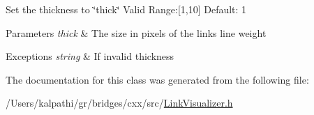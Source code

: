 Set the thickness to \char`\"{}thick\char`\"{} Valid Range\+:\mbox{[}1,10\mbox{]} Default\+: 1


\begin{DoxyParams}{Parameters}
{\em thick} & The size in pixels of the link\textquotesingle{}s line weight \\
\hline
\end{DoxyParams}

\begin{DoxyExceptions}{Exceptions}
{\em string} & If invalid thickness \\
\hline
\end{DoxyExceptions}


The documentation for this class was generated from the following file\+:\begin{DoxyCompactItemize}
\item 
/\+Users/kalpathi/gr/bridges/cxx/src/\mbox{\hyperlink{_link_visualizer_8h}{Link\+Visualizer.\+h}}\end{DoxyCompactItemize}
